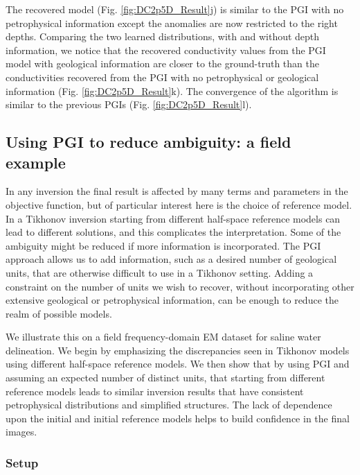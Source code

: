 \documentclass[extra]{gji} %
\begin{document}
The recovered model (Fig. \ref{fig:DC2p5D_Result}j) is similar to the PGI with no petrophysical information except the anomalies are now restricted to the right depths. Comparing the two learned distributions, with and without depth information, we notice that the recovered conductivity values from the PGI model with geological information are closer to the ground-truth than the conductivities recovered from the PGI with no petrophysical or geological information (Fig. \ref{fig:DC2p5D_Result}k). The convergence of the algorithm is similar to the previous PGIs (Fig. \ref{fig:DC2p5D_Result}l).


\subsection{Using PGI to reduce ambiguity: a field example} \label{section:field_data}

In any inversion the final result is affected by many terms and parameters in the objective function, but of particular interest here is the choice of reference model. In a Tikhonov inversion starting from different half-space reference models can lead to different solutions, and this complicates the interpretation. Some of the ambiguity might be reduced if more information is incorporated. The PGI approach allows us to add information, such as a desired number of geological units, that are otherwise difficult to use in a Tikhonov setting. Adding a constraint on the number of units we wish to recover, without incorporating other extensive geological or petrophysical information, can be enough to reduce the realm of possible models.

We illustrate this on a field frequency-domain EM dataset \citep{WardandHohmann} for saline water delineation. We begin by emphasizing the discrepancies seen in Tikhonov models using different half-space reference models. We then show that by using PGI and assuming an expected number of distinct units, that starting from different reference models leads to similar inversion results that have consistent petrophysical distributions and simplified structures. The lack of dependence upon the initial and initial reference models helps to build confidence in the final images.

\subsubsection{Setup}
\end{document}
